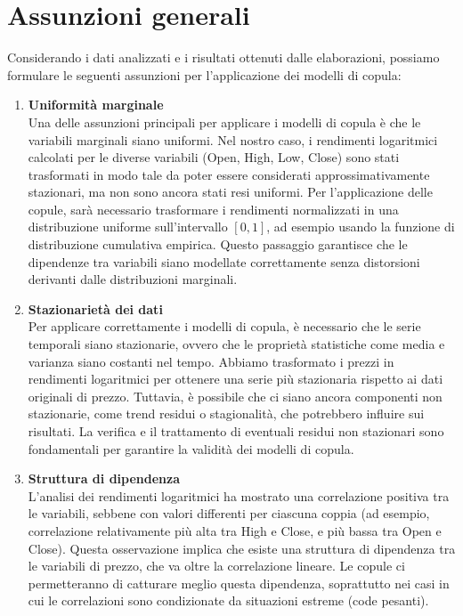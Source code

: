 \documentclass[%
	corpo=11pt,
    twoside,
    stile=classica,
    oldstyle,
    tipotesi=custom,
    greek,
    evenboxes,
]{toptesi}
\begin{document}
\section{Assunzioni generali}

Considerando i dati analizzati e i risultati ottenuti dalle elaborazioni, possiamo formulare le seguenti assunzioni per l’applicazione dei modelli di copula:

\begin{enumerate}
	\item \textbf{Uniformità marginale} \\
	Una delle assunzioni principali per applicare i modelli di copula è che le variabili marginali siano uniformi. Nel nostro caso, i rendimenti logaritmici calcolati per le diverse variabili (Open, High, Low, Close) sono stati trasformati in modo tale da poter essere considerati approssimativamente stazionari, ma non sono ancora stati resi uniformi. Per l’applicazione delle copule, sarà necessario trasformare i rendimenti normalizzati in una distribuzione uniforme sull’intervallo \([0,1]\), ad esempio usando la funzione di distribuzione cumulativa empirica. Questo passaggio garantisce che le dipendenze tra variabili siano modellate correttamente senza distorsioni derivanti dalle distribuzioni marginali.
	
	\item \textbf{Stazionarietà dei dati} \\
	Per applicare correttamente i modelli di copula, è necessario che le serie temporali siano stazionarie, ovvero che le proprietà statistiche come media e varianza siano costanti nel tempo. Abbiamo trasformato i prezzi in rendimenti logaritmici per ottenere una serie più stazionaria rispetto ai dati originali di prezzo. Tuttavia, è possibile che ci siano ancora componenti non stazionarie, come trend residui o stagionalità, che potrebbero influire sui risultati. La verifica e il trattamento di eventuali residui non stazionari sono fondamentali per garantire la validità dei modelli di copula.
	
	\item \textbf{Struttura di dipendenza} \\
	L’analisi dei rendimenti logaritmici ha mostrato una correlazione positiva tra le variabili, sebbene con valori differenti per ciascuna coppia (ad esempio, correlazione relativamente più alta tra High e Close, e più bassa tra Open e Close). Questa osservazione implica che esiste una struttura di dipendenza tra le variabili di prezzo, che va oltre la correlazione lineare. Le copule ci permetteranno di catturare meglio questa dipendenza, soprattutto nei casi in cui le correlazioni sono condizionate da situazioni estreme (code pesanti).
	

\end{enumerate}
\end{document}
